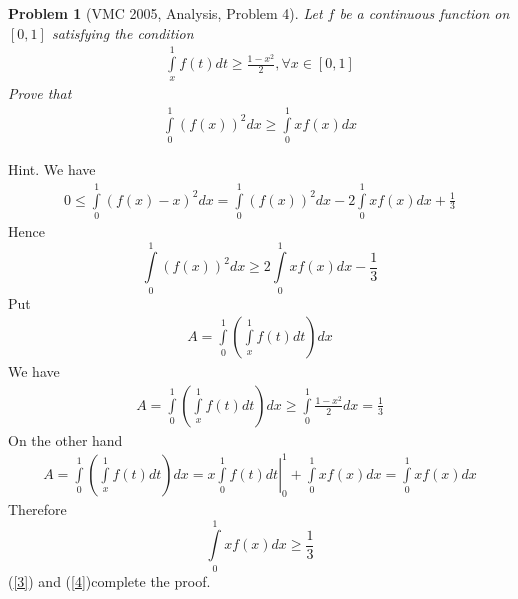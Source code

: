 \documentclass{article}
\newtheorem{problem}{Problem}
\begin{document}
\begin{problem}[VMC 2005, Analysis, Problem 4]
	Let $f$ be a continuous function on $[0,1]$ satisfying the condition
	\begin{align}
		\int\limits_x^1 {f\left( t \right)} dt \ge \frac{{1 - {x^2}}}{2},\forall x \in \left[ {0,1} \right]
	\end{align}
	Prove that
	\begin{align}
		\int\limits_0^1 {{{\left( {f\left( x \right)} \right)}^2}} dx \ge \int\limits_0^1 {xf\left( x \right)} dx
	\end{align}
\end{problem}
{\sf Hint.} We have
\begin{align}
	0 \le \int\limits_0^1 {{{\left( {f\left( x \right) - x} \right)}^2}} dx = \int\limits_0^1 {{{\left( {f\left( x \right)} \right)}^2}} dx - 2\int\limits_0^1 {xf\left( x \right)} dx + \frac{1}{3}
\end{align}
Hence
\begin{equation}
	\label{3}
	\int\limits_0^1 {{{\left( {f\left( x \right)} \right)}^2}} dx \ge 2\int\limits_0^1 {xf\left( x \right)} dx - \frac{1}{3}
\end{equation}
Put 
\begin{align}
	A = \int\limits_0^1 {\left( {\int\limits_x^1 {f\left( t \right)} dt} \right)dx} 
\end{align}
We have
\begin{align}
	A = \int\limits_0^1 {\left( {\int\limits_x^1 {f\left( t \right)} dt} \right)dx}  \ge \int\limits_0^1 {\frac{{1 - {x^2}}}{2}} dx = \frac{1}{3}
\end{align}
On the other hand
\begin{align}
	A = \int\limits_0^1 {\left( {\int\limits_x^1 {f\left( t \right)} dt} \right)dx}  = \left. {x\int\limits_0^1 {f\left( t \right)} dt} \right|_0^1 + \int\limits_0^1 {xf\left( x \right)} dx = \int\limits_0^1 {xf\left( x \right)} dx
\end{align}
Therefore
\begin{equation}
	\label{4}
	\int\limits_0^1 {xf\left( x \right)} dx \ge \frac{1}{3}
\end{equation}
(\ref{3}) and (\ref{4})complete the proof.
\end{document}
